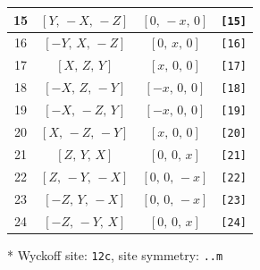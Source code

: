 \documentclass[fleqn,8pt]{jsarticle}
\begin{document}
\begin{longtable}{cccc}
15 & $\left[ Y,\, - X,\, - Z \right]$ & $\left[ 0,\, - x,\, 0 \right]$ & {\tt [15]} \\ \hline
16 & $\left[ - Y,\, X,\, - Z \right]$ & $\left[ 0,\, x,\, 0 \right]$ & {\tt [16]} \\ \hline
17 & $\left[ X,\, Z,\, Y \right]$ & $\left[ x,\, 0,\, 0 \right]$ & {\tt [17]} \\ \hline
18 & $\left[ - X,\, Z,\, - Y \right]$ & $\left[ - x,\, 0,\, 0 \right]$ & {\tt [18]} \\ \hline
19 & $\left[ - X,\, - Z,\, Y \right]$ & $\left[ - x,\, 0,\, 0 \right]$ & {\tt [19]} \\ \hline
20 & $\left[ X,\, - Z,\, - Y \right]$ & $\left[ x,\, 0,\, 0 \right]$ & {\tt [20]} \\ \hline
21 & $\left[ Z,\, Y,\, X \right]$ & $\left[ 0,\, 0,\, x \right]$ & {\tt [21]} \\ \hline
22 & $\left[ Z,\, - Y,\, - X \right]$ & $\left[ 0,\, 0,\, - x \right]$ & {\tt [22]} \\ \hline
23 & $\left[ - Z,\, Y,\, - X \right]$ & $\left[ 0,\, 0,\, - x \right]$ & {\tt [23]} \\ \hline
24 & $\left[ - Z,\, - Y,\, X \right]$ & $\left[ 0,\, 0,\, x \right]$ & {\tt [24]} \\
\end{longtable}
* Wyckoff site: {\tt 12c}, site symmetry: {\tt ..m}
\renewcommand{\arraystretch}{1.2}
\end{document}
